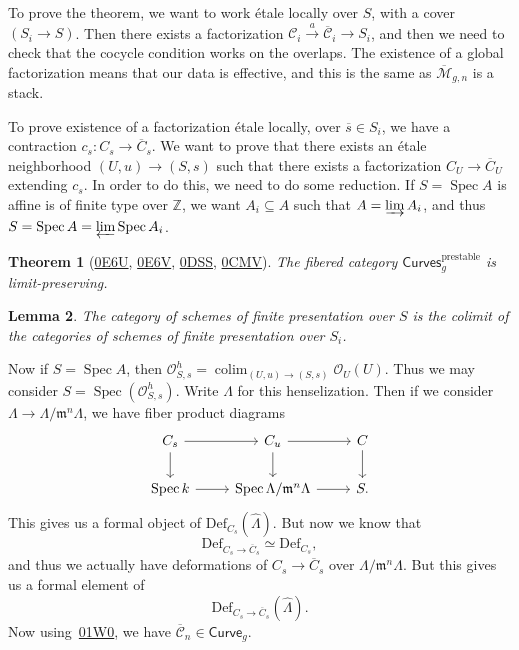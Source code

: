 \documentclass[leqno, openany]{memoir}
\newtheorem{thm}{Theorem}[section]
\newtheorem{lem}[thm]{Lemma}
\theoremstyle{definition}
\theoremstyle{remark}
\theoremstyle{plain}
\theoremstyle{definition}
\theoremstyle{remark}
\newcommand{\Z}{\mathbb{Z}}
\newcommand{\mc}[1]{\mathcal{#1}}
\newcommand{\mf}[1]{\mathfrak{#1}}
\newcommand{\mr}[1]{\mathrm{#1}}
\newcommand{\ms}[1]{\mathsf{#1}}
\newcommand{\ol}[1]{\overline{#1}}
\newcommand{\wh}[1]{\widehat{#1}}
\DeclareMathOperator{\Spec}{Spec}
\begin{document}
To prove the theorem, we want to work \'etale locally over $S$, with a cover $(S_i \to S)$. Then there exists a factorization $\mc{C}_i \xrightarrow{a} \ol{\mc{C}}_i \to S_i$, and then we need to check that the cocycle condition works on the overlaps. The existence of a global factorization means that our data is effective, and this is the same as $\ol{\mc{M}}_{g, n}$ is a stack.

To prove existence of a factorization \'etale locally, over $\ol{s} \in S_i$, we have a contraction $c_s \colon C_s \to \ol{C}_s$. We want to prove that there exists an \'etale neighborhood $(U, u) \to (S, s)$ such that there exists a factorization $C_U \to \ol{C}_U$ extending $c_s$. In order to do this, we need to do some reduction. If $S = \Spec A$ is affine is of finite type over $\Z$, we want $A_i \subseteq A$ such that $A = \varinjlim A_i$, and thus $S = \Spec A = \varprojlim \Spec A_i$.

\begin{thm}[\href{https://stacks.math.columbia.edu/tag/0E6U}{0E6U}, \href{https://stacks.math.columbia.edu/tag/0E6V}{0E6V}, \href{https://stacks.math.columbia.edu/tag/0DSS}{0DSS}, \href{https://stacks.math.columbia.edu/tag/0CMV}{0CMV}]
    The fibered category $\ms{Curves}_g^{\text{prestable}}$ is limit-preserving.
\end{thm}

\begin{lem}
    The category of schemes of finite presentation over $S$ is the colimit of the categories of schemes of finite presentation over $S_i$.
\end{lem}

Now if $S = \Spec A$, then $\mc{O}_{S, s}^h = \operatorname{colim}_{(U, u) \to (S, s)} \mc{O}_U(U)$. Thus we may consider $S = \Spec (\mc{O}_{S, s}^h)$. Write $\Lambda$ for this henselization. Then if we consider $\Lambda \to \Lambda / \mf{m}^n \Lambda$, we have fiber product diagrams
\begin{equation*}
\begin{tikzcd}
    C_s \ar{r} \ar{d} & C_u \ar{d} \ar{r} & C \ar{d} \\
    \Spec k \ar{r} & \Spec \Lambda / \mf{m}^n \Lambda \ar{r} & S.
\end{tikzcd}
\end{equation*}
This gives us a formal object of $\mr{Def}_{C_s}(\wh{\Lambda})$. But now we know that
\[ \mr{Def}_{C_s \to \ol{C}_s} \simeq \mr{Def}_{C_s}, \]
and thus we actually have deformations of $C_s \to \ol{C}_s$ over $\Lambda / \mf{m}^n \Lambda$. But this gives us a formal element of
\[ \mr{Def}_{C_s \to \ol{C}_s} (\wh{\Lambda}). \]
Now using~\href{https://stacks.math.columbia.edu/tag/01W0}{01W0}, we have $\ol{\mc{C}}_n \in \ms{Curve}_g$.
\end{document}
